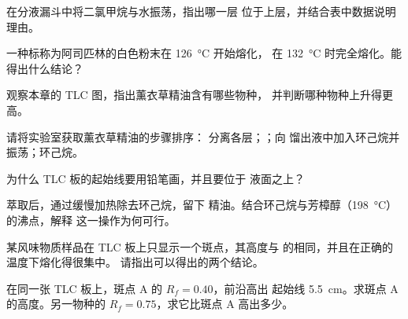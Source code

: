 \begin{exercise}[$\star\star$]\label{exo:g10:chemical-species:7}
在分液漏斗中将二氯甲烷与水振荡，指出哪一层
位于上层，并结合表中数据说明理由。
\end{exercise}

\begin{exercise}[$\star\star$]\label{exo:g10:chemical-species:8}
一种标称为阿司匹林的白色粉末在 \qty{126}{\celsius} 开始熔化，
在 \qty{132}{\celsius} 时完全熔化。能得出什么结论？
\end{exercise}

\begin{exercise}[$\star\star$]\label{exo:g10:chemical-species:9}
观察本章的 TLC 图，指出薰衣草精油含有哪些物种，
并判断哪种物种上升得更高。
\end{exercise}

\begin{exercise}[$\star\star$]\label{exo:g10:chemical-species:10}
请将实验室获取薰衣草精油的步骤排序：
分离各层；；向
馏出液中加入环己烷并振荡；环己烷。
\end{exercise}

\begin{exercise}[$\star\star$]\label{exo:g10:chemical-species:11}
为什么 TLC 板的起始线要用铅笔画，并且要位于
液面之上？
\end{exercise}

\begin{exercise}[$\star\star\star$]\label{exo:g10:chemical-species:12}
萃取后，通过缓慢加热除去环己烷，留下
精油。结合环己烷与芳樟醇（\qty{198}{\celsius}）的沸点，解释
这一操作为何可行。
\end{exercise}

\begin{exercise}[$\star\star\star$]\label{exo:g10:chemical-species:13}
某风味物质样品在 TLC 板上只显示一个斑点，其高度与
的相同，并且在正确的温度下熔化得很集中。
请指出可以得出的两个结论。
\end{exercise}

\begin{exercise}[$\star\star\star$]\label{exo:g10:chemical-species:14}
在同一张 TLC 板上，斑点 A 的 $R_f = 0.40$，前沿高出
起始线 \qty{5.5}{cm}。求斑点 A 的高度。另一物种的
$R_f = 0.75$，求它比斑点 A 高出多少。
\end{exercise}

